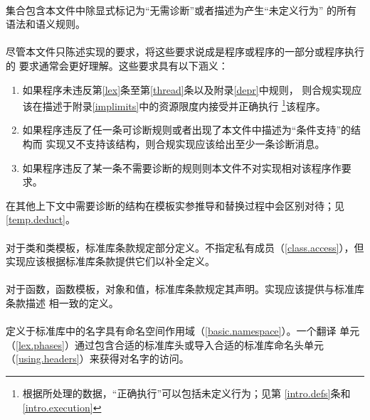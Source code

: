 \paragraph{} %
集合包含本文件中除显式标记为“无需诊断”或者描述为产生“未定义行为”
的所有语法和语义规则。

\paragraph{} %
尽管本文件只陈述\cpp{}实现的要求，将这些要求说成是程序或程序的一部分或程序执行的
要求通常会更好理解。这些要求具有以下涵义：
\begin{enumerate}
  \item 如果程序未违反第\ref{lex}条至第\ref{thread}条以及附录\ref{depr}中规则，
        则合规实现应该在描述于附录\ref{implimits}中的资源限度内接受并正确执行
        \footnote{根据所处理的数据，“正确执行”可以包括未定义行为；见第
        \ref{intro.defs}条和\ref{intro.execution}}该程序。
  \item 如果程序违反了任一条可诊断规则或者出现了本文件中描述为“条件支持”的结构而
        实现又不支持该结构，则合规实现应该给出至少一条诊断消息。
  \item 如果程序违反了某一条不需要诊断的规则则本文件不对实现相对该程序作要求。
\end{enumerate}
\begin{note}
  在其他上下文中需要诊断的结构在模板实参推导和替换过程中会区别对待；见
  \ref{temp.deduct}。
\end{note}

\paragraph{} %
对于类和类模板，标准库条款规定部分定义。不指定私有成员（\ref{class.access}），但
实现应该根据标准库条款提供它们以补全定义。

\paragraph{} %
对于函数，函数模板，对象和值，标准库条款规定其声明。实现应该提供与标准库条款描述
相一致的定义。

\paragraph{} %
定义于标准库中的名字具有命名空间作用域（\ref{basic.namespace}）。一个\cpp{}翻译
单元（\ref{lex.phases}）通过包含合适的标准库头或导入合适的标准库命名头单元
（\ref{using.headers}）来获得对名字的访问。

